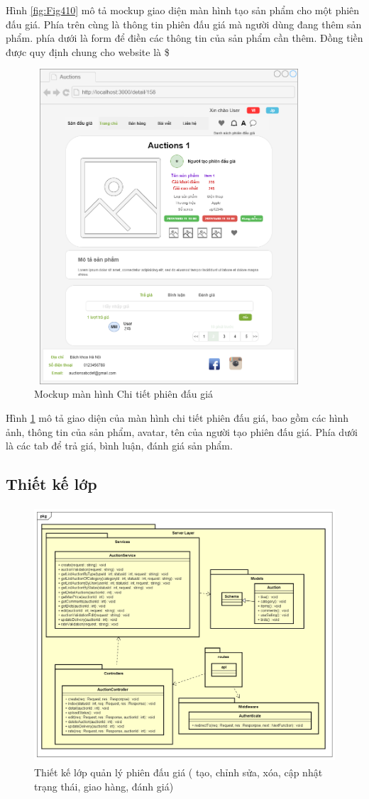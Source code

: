 \documentclass[../DoAn.tex]{subfiles}
\begin{document}
Hình \ref{fig:Fig410} mô tả mockup giao diện màn hình tạo sản phẩm cho một phiên đấu giá. Phía trên cùng là thông tin phiên đấu giá mà người dùng đang thêm sản phẩm. phía dưới là form để điền các thông tin của sản phẩm cần thêm. Đồng tiền được quy định chung cho website là \$
\begin{figure}[H]
    \centering
    \includegraphics[width=10.04cm,height=11.76cm]{Hinhve/detailitem.png}
    \caption{Mockup màn hình Chi tiết phiên đấu giá}
    \label{fig:Fig411}
\end{figure}
Hình \ref{fig:Fig411} mô tả giao diện của màn hình chi tiết phiên đấu giá, bao gồm các hình ảnh, thông tin của sản phẩm, avatar, tên của người tạo phiên đấu giá. Phía dưới là các tab để trả giá, bình luận, đánh giá sản phẩm. 
\subsection{Thiết kế lớp}
\begin{figure}[H]
    \centering
    \includegraphics[width=11.4cm,height=9.54cm]{Hinhve/detailclass.png}
    \caption{Thiết kế lớp quản lý phiên đấu giá ( tạo, chỉnh sửa, xóa, cập nhật trạng thái, giao hàng, đánh giá)}
    \label{fig:Fig412}
\end{figure}
\end{document}
